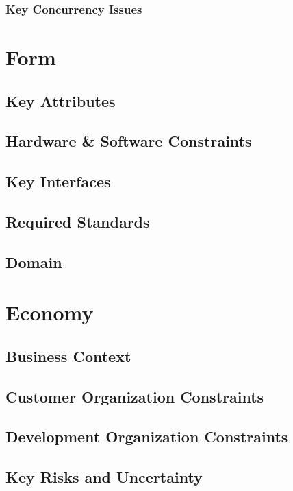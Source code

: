 \documentclass[12pt]{article}
\begin{document}
\subsubsection*{Key Concurrency Issues}

\section*{Form}

\subsection*{Key Attributes}

\subsection*{Hardware \& Software Constraints}

\subsection*{Key Interfaces}

\subsection*{Required Standards}

\subsection*{Domain}

\section*{Economy}

\subsection*{Business Context}

\subsection*{Customer Organization Constraints}

\subsection*{Development Organization Constraints}

\subsection*{Key Risks and Uncertainty}
\end{document}
